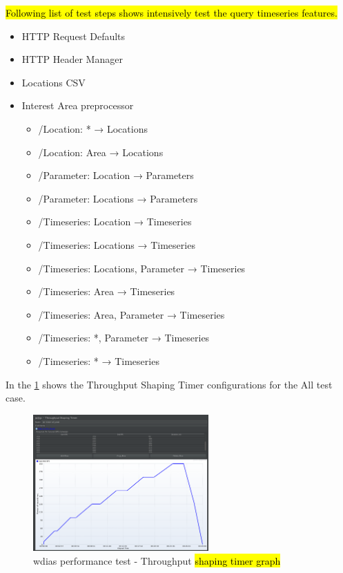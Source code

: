 \hl{Following list of test steps shows intensively test the query timeseries features.}

\begin{itemize}
    \item HTTP Request Defaults
    \item HTTP Header Manager
    \item Locations CSV
    \item Interest Area preprocessor
    \begin{itemize}
        \item /Location: * → Locations
    	\item /Location: Area → Locations
    	\item /Parameter: Location → Parameters
    	\item /Parameter: Locations → Parameters
    	\item /Timeseries: Location → Timeseries
    	\item /Timeseries: Locations → Timeseries
    	\item /Timeseries: Locations, Parameter → Timeseries
    	\item /Timeseries: Area → Timeseries
    	\item /Timeseries: Area, Parameter → Timeseries
    	\item /Timeseries: *, Parameter → Timeseries
    	\item /Timeseries: * → Timeseries
	\end{itemize}
\end{itemize}

In the \ref{fi:test_prod_throughtput_shaping_timer} shows the Throughput Shaping Timer configurations for the All test case.

\begin{figure}[htp]
    \centering
    \includegraphics[width=0.6\textwidth]{results/work_load/test_prod_throughtput_shaping_timer.png}
    \caption{\acrshort{wdias} performance test - Throughput \hl{shaping timer graph}}
    \label{fi:test_prod_throughtput_shaping_timer}
\end{figure}

